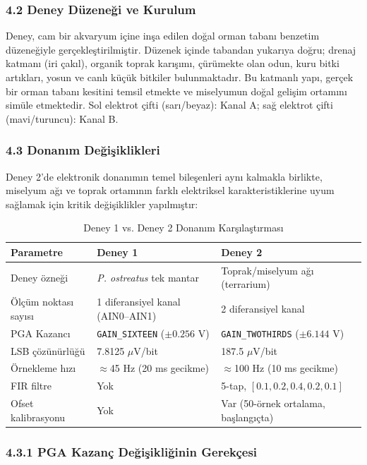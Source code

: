 \documentclass[11pt,a4paper]{article}
\begin{document}
\subsubsection*{4.2 Deney Düzeneği ve Kurulum}

Deney, cam bir akvaryum içine inşa edilen doğal orman tabanı benzetim düzeneğiyle gerçekleştirilmiştir. Düzenek içinde tabandan yukarıya doğru; drenaj katmanı (iri çakıl), organik toprak karışımı, çürümekte olan odun, kuru bitki artıkları, yosun ve canlı küçük bitkiler bulunmaktadır. Bu katmanlı yapı, gerçek bir orman tabanı kesitini temsil etmekte ve miselyumun doğal gelişim ortamını simüle etmektedir. Sol elektrot çifti (sarı/beyaz): Kanal A; sağ elektrot çifti (mavi/turuncu): Kanal B.

\subsubsection*{4.3 Donanım Değişiklikleri}

Deney 2'de elektronik donanımın temel bileşenleri aynı kalmakla birlikte, miselyum ağı ve toprak ortamının farklı elektriksel karakteristiklerine uyum sağlamak için kritik değişiklikler yapılmıştır:

\begin{table}[h]
\centering
\caption{Deney 1 vs. Deney 2 Donanım Karşılaştırması}
\begin{tabular}{p{3cm}p{5cm}p{5cm}}
\toprule
\textbf{Parametre} & \textbf{Deney 1} & \textbf{Deney 2}\\
\midrule
Deney özneği & \textit{P. ostreatus} tek mantar & Toprak/miselyum ağı (terrarium)\\
Ölçüm noktası sayısı & 1 diferansiyel kanal (AIN0--AIN1) & 2 diferansiyel kanal\\
PGA Kazancı & \texttt{GAIN\_SIXTEEN} ($\pm0.256$ V) & \texttt{GAIN\_TWOTHIRDS} ($\pm6.144$ V)\\
LSB çözünürlüğü & 7.8125 $\mu$V/bit & 187.5 $\mu$V/bit\\
Örnekleme hızı & $\approx$45 Hz (20 ms gecikme) & $\approx$100 Hz (10 ms gecikme)\\
FIR filtre & Yok & 5-tap, $[0.1, 0.2, 0.4, 0.2, 0.1]$\\
Ofset kalibrasyonu & Yok & Var (50-örnek ortalama, başlangıçta)\\
\bottomrule
\end{tabular}
\end{table}

\subsubsection*{4.3.1 PGA Kazanç Değişikliğinin Gerekçesi}
\end{document}
